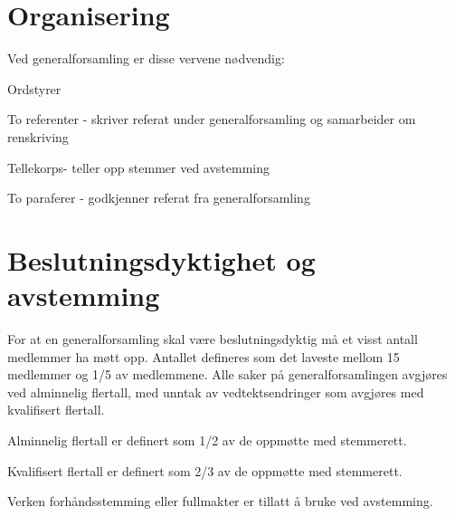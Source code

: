 \section{Organisering}
\label{sec:organisering}
Ved generalforsamling er disse vervene nødvendig: 

\begin{liste}
	\item Ordstyrer
	\item To referenter - skriver referat under generalforsamling og samarbeider om \mbox{renskriving}
	\item Tellekorps\space \space \space \space - teller opp stemmer ved avstemming
	\item To paraferer - godkjenner referat fra generalforsamling
	
\end{liste}

\newpage
\section{Beslutningsdyktighet og avstemming}

For at en generalforsamling skal være beslutningsdyktig må et visst antall medlemmer ha møtt opp. Antallet defineres som det laveste mellom 15 medlemmer og 1/5 av medlemmene. Alle saker på generalforsamlingen avgjøres ved alminnelig flertall, med unntak av vedtektsendringer som avgjøres med kvalifisert flertall.

\begin{liste}
	\item Alminnelig flertall er definert som 1/2 av de oppmøtte med stemmerett.
	\item Kvalifisert flertall er definert som 2/3 av de oppmøtte med stemmerett.
\end{liste}

Verken forhåndsstemming eller fullmakter er tillatt å bruke ved avstemming.


